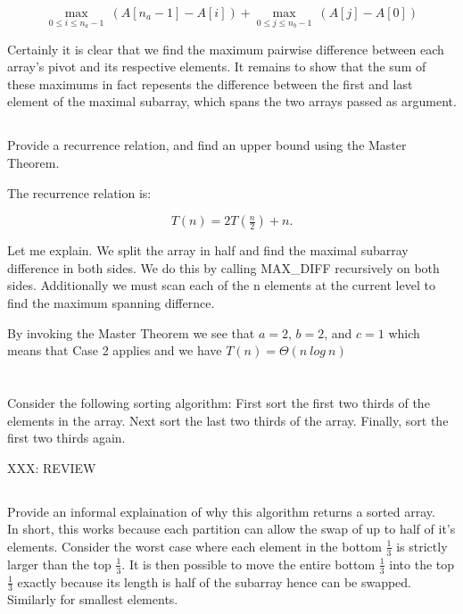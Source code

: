 \documentclass{amsart}
\theoremstyle{definition}
\theoremstyle{remark}
\numberwithin{equation}{section}
\begin{document}
$$ \max_{0 \leq i \leq n_a -1}\ (A[n_a-1] - A[i]) + \max_{0 \leq j \leq n_b -1}\ (A[j] - A[0]) $$

\proof 

Certainly it is clear that we find the maximum pairwise
difference between each array's pivot and its respective elements. It
remains to show that the sum of these maximums in fact repesents the
difference between the first and last element of the maximal subarray,
which spans the two arrays passed as argument.


\subsection{} Provide a recurrence relation, and find an upper bound
using the Master Theorem.

The recurrence relation is:

$$ T( n ) = 2T(\tfrac{n}{2}) + n. $$

Let me explain. We split the array in half and find the maximal subarray
difference in both sides. We do this by calling MAX\_DIFF recursively on
both sides. Additionally we must scan each of the n elements at the current
level to find the maximum spanning differnce.

By invoking the Master Theorem we see that $a=2$, $b=2$, and $c=1$ which
means that Case 2 applies and we have $T( n ) = \Theta( n\ log\ n )$

\section{} Consider the following sorting algorithm: First sort the
first two thirds of the elements in the array. Next sort the last two
thirds of the array. Finally, sort the first two thirds again.

XXX: REVIEW
\subsection{} Provide an informal explaination of why this algorithm
returns a sorted array. \\

In short, this works because each partition can allow the swap of up to
half of it's elements. Consider the worst case where each element in the
bottom $\frac{1}{3}$ is strictly larger than the top $\frac{1}{3}$. It
is then possible to move the entire bottom $\frac{1}{3}$ into the top
$\frac{1}{3}$ exactly because its length is half of the subarray hence
can be swapped. Similarly for smallest elements.
\end{document}
